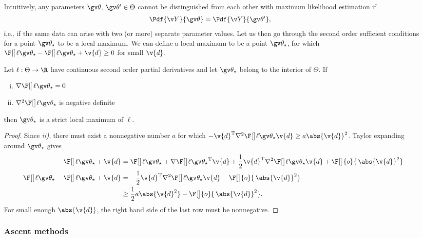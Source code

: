 Intuitively, any parameters $\Th,\:\Th' \in \Theta$ cannot be distinguished
from each other with maximum likelihood estimation if
\begin{align}
	\Pdf{\Y}{\Th}&=\Pdf{\Y}{\Th'},
\end{align}
i.e., if the same data can arise with two (or more) separate
parameter values. Let us then go through the second order sufficient conditions
for a point $\Th_\star$ to be a local maximum. We can define a local maximum
to be a point $\Th_\star$, for which $\lLH[\Th_\star]-\lLH[\Th_\star+\v{d}] \geq 0$ for small $\v{d}$.

\begin{proposition}\label{prop:cond_for_max}
Let $\ell:\Theta \to \R$ have continuous second order partial derivatives and let $\Th_\star$
belong to the interior of $\Theta$. If
\begin{enumerate}[i)] \addtolength{\leftskip}{1cm} \itemsep1pt \parskip0pt 
  \item $\nabla\lLH[\Th_\star] =0$ 
  \item $\nabla^2\lLH[\Th_\star]$ is negative definite
\end{enumerate}
then $\Th_\star$ is a strict local maximum of $\ell$.
\end{proposition}
 \begin{proof}
 Since \textit{ii)}, there must exist a nonnegative number $a$ for which 
 $-\v{d}^\tr\nabla^2\lLH[\Th_\star]\v{d} \geq a\abs{\v{d}}^2$.
 Taylor expanding around $\Th_\star$ gives
 \begin{align*}
	\lLH[\Th_\star+\v{d}] &= \lLH[\Th_\star]+\nabla\lLH[\Th_\star]^\tr\v{d}+\frac{1}{2}\v{d}^\tr\nabla^2\lLH[\Th_\star]\v{d}+\F[\big]{o}{\,\abs{\v{d}}^2}\\
	\lLH[\Th_\star]-\lLH[\Th_\star+\v{d}] &= -\frac{1}{2}\v{d}^\tr\nabla^2\lLH[\Th_\star]\v{d}-\F[\big]{o}{\,\abs{\v{d}}^2}\\
	&\geq \frac{1}{2}a\abs{\v{d}^2}-\F[\big]{o}{\,\abs{\v{d}}^2}.
\end{align*}
For small enough $\abs{\v{d}}$, the right hand side of the last row must be nonnegative.
 \end{proof}

\parencite{Haykin2001,Cappe2005}

\subsubsection{Ascent methods}

